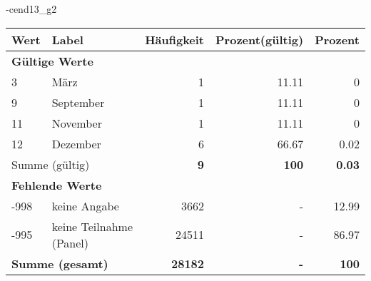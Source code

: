                 \vspace*{-\baselineskip}
					\begin{filecontents}{\jobname-cend13_g2}
					\begin{longtable}{lXrrr}
					\toprule
					\textbf{Wert} & \textbf{Label} & \textbf{Häufigkeit} & \textbf{Prozent(gültig)} & \textbf{Prozent} \\
					\endhead
					\midrule
					\multicolumn{5}{l}{\textbf{Gültige Werte}}\\

					3 &
					\multicolumn{1}{X}{ März   } &


					  \num{1} &
					  \num[round-mode=places,round-precision=2]{11.11} &
					    \num[round-mode=places,round-precision=2]{0} \\

					9 &
					\multicolumn{1}{X}{ September   } &


					  \num{1} &
					  \num[round-mode=places,round-precision=2]{11.11} &
					    \num[round-mode=places,round-precision=2]{0} \\

					11 &
					\multicolumn{1}{X}{ November   } &


					  \num{1} &
					  \num[round-mode=places,round-precision=2]{11.11} &
					    \num[round-mode=places,round-precision=2]{0} \\

					12 &
					\multicolumn{1}{X}{ Dezember   } &


					  \num{6} &
					  \num[round-mode=places,round-precision=2]{66.67} &
					    \num[round-mode=places,round-precision=2]{0.02} \\
					\midrule
					\multicolumn{2}{l}{Summe (gültig)} &
					  \textbf{\num{9}} &
					\textbf{100} &
					  \textbf{\num[round-mode=places,round-precision=2]{0.03}} \\
					\multicolumn{5}{l}{\textbf{Fehlende Werte}}\\
							-998 &
							keine Angabe &
							  \num{3662} &
							 - &
							  \num[round-mode=places,round-precision=2]{12.99} \\
							-995 &
							keine Teilnahme (Panel) &
							  \num{24511} &
							 - &
							  \num[round-mode=places,round-precision=2]{86.97} \\
					\midrule
					\multicolumn{2}{l}{\textbf{Summe (gesamt)}} &
				      \textbf{\num{28182}} &
				    \textbf{-} &
				    \textbf{100} \\
					\bottomrule
					\end{longtable}
					\end{filecontents}
